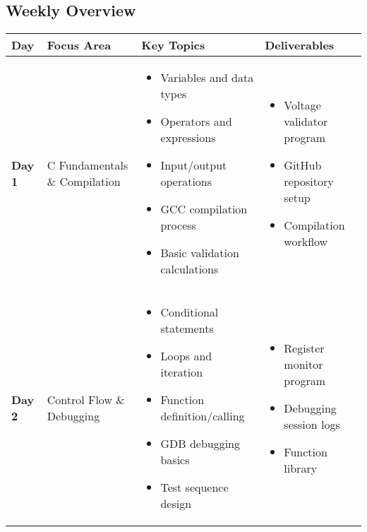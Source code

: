\documentclass[11pt,a4paper]{article}
\begin{document}
\subsection{Weekly Overview}

\begin{longtable}{|p{1.5cm}|p{4cm}|p{6cm}|p{3cm}|}
\hline
\textbf{Day} & \textbf{Focus Area} & \textbf{Key Topics} & \textbf{Deliverables} \\
\hline
\endhead

\textbf{Day 1} & C Fundamentals \& Compilation &
\begin{itemize}[nosep]
    \item Variables and data types
    \item Operators and expressions
    \item Input/output operations
    \item GCC compilation process
    \item Basic validation calculations
\end{itemize} &
\begin{itemize}[nosep]
    \item Voltage validator program
    \item GitHub repository setup
    \item Compilation workflow
\end{itemize} \\
\hline

\textbf{Day 2} & Control Flow \& Debugging &
\begin{itemize}[nosep]
    \item Conditional statements
    \item Loops and iteration
    \item Function definition/calling
    \item GDB debugging basics
    \item Test sequence design
\end{itemize} &
\begin{itemize}[nosep]
    \item Register monitor program
    \item Debugging session logs
    \item Function library
\end{itemize} \\
\hline


\end{longtable}
\end{document}
